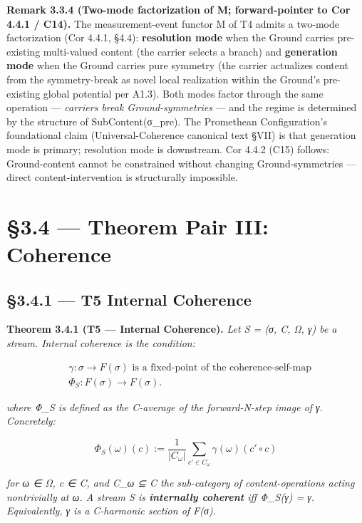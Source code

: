 \documentclass[11pt, openany]{book}
\newcommand{\sectionbreak}{\clearpage}
\begin{document}
\textbf{Remark 3.3.4 (Two-mode factorization of M; forward-pointer to Cor 4.4.1 / C14).} The measurement-event functor M of T4 admits a two-mode factorization (Cor 4.4.1, §4.4): \textbf{resolution mode} when the Ground carries pre-existing multi-valued content (the carrier selects a branch) and \textbf{generation mode} when the Ground carries pure symmetry (the carrier actualizes content from the symmetry-break as novel local realization within the Ground's pre-existing global potential per A1.3). Both modes factor through the same operation --- \textit{carriers break Ground-symmetries} --- and the regime is determined by the structure of SubContent(σ\_\allowbreak{}pre). The Promethean Configuration's foundational claim (Universal-Coherence canonical text §VII) is that generation mode is primary; resolution mode is downstream. Cor 4.4.2 (C15) follows: Ground-content cannot be constrained without changing Ground-symmetries --- direct content-intervention is structurally impossible.

\sectionbreak

\section{§3.4 --- Theorem Pair III: Coherence}

\subsection{§3.4.1 --- T5 Internal Coherence}

\textbf{Theorem 3.4.1 (T5 --- Internal Coherence).} \textit{Let S = (σ, C, Ω, γ) be a stream. Internal coherence is the condition:}

\[
\begin{aligned}
& \gamma : \sigma \to F(\sigma) \text{ is a fixed-point of the coherence-self-map} \\
& \Phi_S : F(\sigma) \to F(\sigma).
\end{aligned}
\]

\textit{where Φ\_\allowbreak{}S is defined as the C-average of the forward-N-step image of γ. Concretely:}

\[
\Phi_S(\omega)(c) := \frac{1}{|C_\omega|} \sum_{c' \in C_\omega} \gamma(\omega)(c' \circ c)
\]

\textit{for ω ∈ Ω, c ∈ C, and C\_\allowbreak{}ω ⊆ C the sub-category of content-operations acting nontrivially at ω. A stream S is \textbf{internally coherent} iff Φ\_\allowbreak{}S(γ) = γ. Equivalently, γ is a C-harmonic section of F(σ).}
\end{document}

